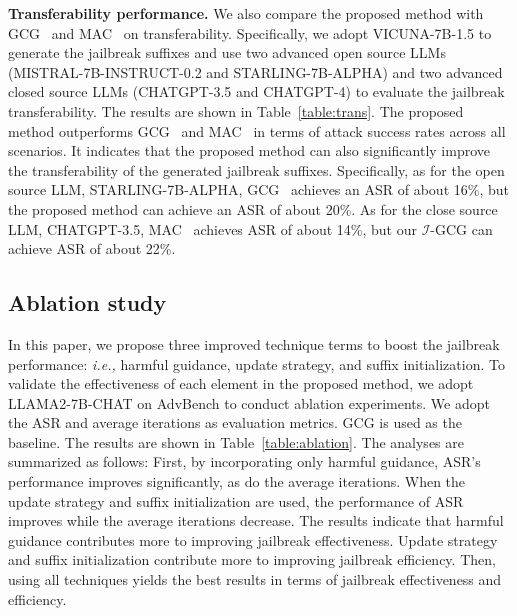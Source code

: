 
\par \noindent\textbf{Transferability performance.} 
We also compare the proposed method with GCG~\cite{zou2023universal} and MAC~\cite{zhang2024boosting} on transferability. Specifically, we adopt VICUNA-7B-1.5 to generate the jailbreak suffixes and use two advanced open source LLMs (MISTRAL-7B-INSTRUCT-0.2 and STARLING-7B-ALPHA) and two advanced closed source LLMs (CHATGPT-3.5 and CHATGPT-4) to evaluate the jailbreak transferability. The results are shown in Table~\ref{table:trans}. The proposed method outperforms GCG~\cite{zou2023universal} and MAC~\cite{zhang2024boosting} in terms of attack success rates across all scenarios. It indicates that the proposed method can also significantly improve the transferability of the generated jailbreak suffixes. Specifically, as for the open source LLM, STARLING-7B-ALPHA, GCG~\cite{zou2023universal} achieves an ASR of about 16\%, but the proposed method can achieve an ASR of about 20\%. As for the close source LLM, CHATGPT-3.5, MAC~\cite{zhang2024boosting} achieves ASR of about 14\%, but our $\mathcal{I}$-GCG can achieve ASR of about 22\%. 




\subsection{Ablation study}
In this paper, we propose three improved technique terms to boost the jailbreak performance: \textit{i.e.,} harmful guidance, update strategy, and suffix initialization. To validate the effectiveness of each element in the proposed method, we adopt LLAMA2-7B-CHAT on AdvBench to conduct ablation experiments. We adopt the ASR and average iterations as evaluation metrics. GCG is used as the baseline. The results are shown in Table~\ref{table:ablation}. The analyses are summarized as follows: First, by incorporating only harmful guidance, ASR's performance improves significantly, as do the average iterations. When the update strategy and suffix initialization are used, the performance of ASR improves while the average iterations decrease. The results indicate that harmful guidance contributes more to improving jailbreak effectiveness. Update strategy and suffix initialization contribute more to improving jailbreak efficiency. Then, using all techniques yields the best results in terms of jailbreak effectiveness and efficiency.

